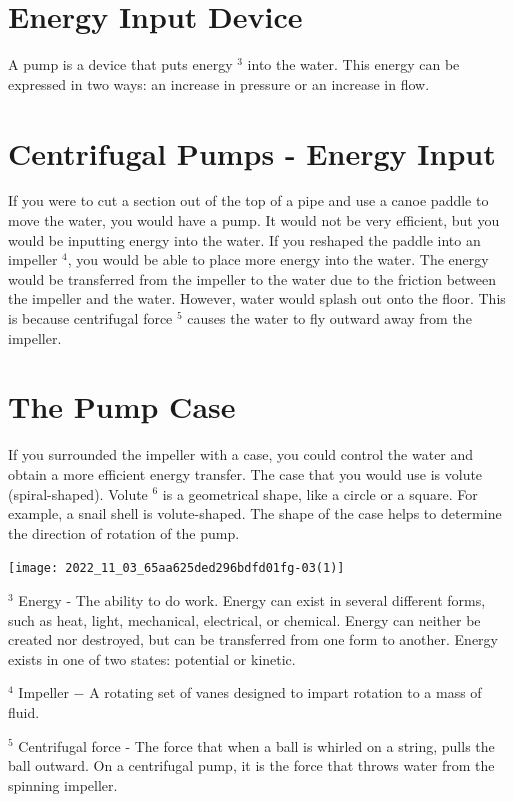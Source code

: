 \documentclass[10pt]{article}
\begin{document}
\section{Energy Input Device}
A pump is a device that puts energy ${ }^{3}$ into the water. This energy can be expressed in two ways: an increase in pressure or an increase in flow.

\section{Centrifugal Pumps - Energy Input}
If you were to cut a section out of the top of a pipe and use a canoe paddle to move the water, you would have a pump. It would not be very efficient, but you would be inputting energy into the water. If you reshaped the paddle into an impeller ${ }^{4}$, you would be able to place more energy into the water. The energy would be transferred from the impeller to the water due to the friction between the impeller and the water. However, water would splash out onto the floor. This is because centrifugal force ${ }^{5}$ causes the water to fly outward away from the impeller.

\section{The Pump Case}
If you surrounded the impeller with a case, you could control the water and obtain a more efficient energy transfer. The case that you would use is volute (spiral-shaped). Volute ${ }^{6}$ is a geometrical shape, like a circle or a square. For example, a snail shell is volute-shaped. The shape of the case helps to determine the direction of rotation of the pump.

\texttt{[image: 2022\_11\_03\_65aa625ded296bdfd01fg-03(1)]}

${ }^{3}$ Energy - The ability to do work. Energy can exist in several different forms, such as heat, light, mechanical, electrical, or chemical. Energy can neither be created nor destroyed, but can be transferred from one form to another. Energy exists in one of two states: potential or kinetic.

${ }^{4}$ Impeller $-$ A rotating set of vanes designed to impart rotation to a mass of fluid.

${ }^{5}$ Centrifugal force - The force that when a ball is whirled on a string, pulls the ball outward. On a centrifugal pump, it is the force that throws water from the spinning impeller.
\end{document}
